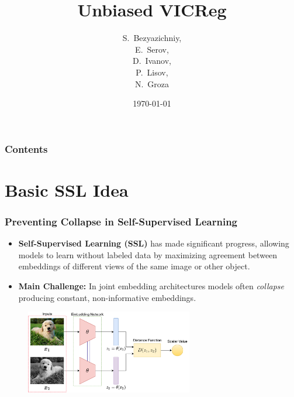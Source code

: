 \documentclass[13pt,aspectratio=169]{beamer}
\title{Unbiased VICReg}
\author{S.~Bezyazichniy, \\E.~Serov, \\D.~Ivanov, \\P.~Lisov, \\N.~Groza}
\institute{MIPT}
\date{\today}
\begin{document}
\begin{frame}
  \titlepage
\end{frame}

\begin{frame}
	\frametitle{Contents}
	\tableofcontents
\end{frame}

\section{Basic SSL Idea}
\begin{frame}
  \frametitle{Preventing Collapse in Self-Supervised Learning}
  \begin{itemize}
    \item \textbf{Self-Supervised Learning (SSL)} has made
      significant progress, allowing models to learn without
      labeled data by maximizing agreement between embeddings
      of different views of the same image or other object.
    \item \textbf{Main Challenge:} In joint embedding architectures
      models often \textit{collapse} producing constant, non-informative
      embeddings.
  \end{itemize}

  \begin{figure}
      \begin{center}
  	    \includegraphics[width=0.65\textwidth]{imgs/je_architecture.png}
      \end{center}
  \end{figure}
  
\end{frame}
\end{document}
